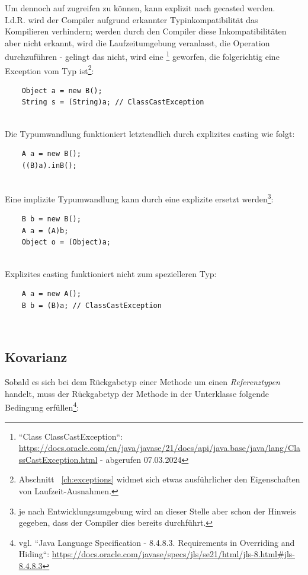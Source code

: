 \noindent
Um dennoch auf  zugreifen zu können, kann  explizit nach  gecasted werden.\\
\noindent
I.d.R. wird der Compiler aufgrund erkannter Typinkompatibilität das Kompilieren verhindern; werden durch den Compiler diese Inkompatibilitäten aber nicht erkannt, wird die Laufzeitumgebung veranlasst, die Operation durchzuführen - gelingt das nicht, wird eine \footnote{
``Class ClassCastException``: \url{https://docs.oracle.com/en/java/javase/21/docs/api/java.base/java/lang/ClassCastException.html} - abgerufen 07.03.2024
} geworfen, die folgerichtig eine Exception vom Typ  ist\footnote{
Abschnitt ~\ref{ch:exceptions} widmet sich etwas ausführlicher den Eigenschaften von Laufzeit-Ausnahmen.
}:

\begin{verbatim}
    Object a = new B();
    String s = (String)a; // ClassCastException
\end{verbatim}\\

\noindent
Die Typumwandlung funktioniert letztendlich durch explizites casting wie folgt:

\begin{verbatim}
    A a = new B();
    ((B)a).inB();
\end{verbatim}\\

Eine implizite Typumwandlung kann durch eine explizite ersetzt werden\footnote{
    je nach Entwicklungsumgebung wird an dieser Stelle aber schon der Hinweis gegeben, dass der Compiler dies bereits durchführt.
}:

\begin{verbatim}
    B b = new B();
    A a = (A)b;
    Object o = (Object)a;
\end{verbatim}\\

Explizites casting funktioniert nicht zum spezielleren Typ:

\begin{verbatim}
    A a = new A();
    B b = (B)a; // ClassCastException
\end{verbatim}\\


\subsection{Kovarianz}\label{subsec:covariance}
Sobald es sich bei dem Rückgabetyp einer Methode um einen \textit{Referenztypen} handelt, muss der Rückgabetyp der Methode in der Unterklasse folgende Bedingung erfüllen\footnote{
    vgl. ``Java Language Specification - 8.4.8.3. Requirements in Overriding and Hiding``: \url{https://docs.oracle.com/javase/specs/jls/se21/html/jls-8.html#jls-8.4.8.3}
}:

